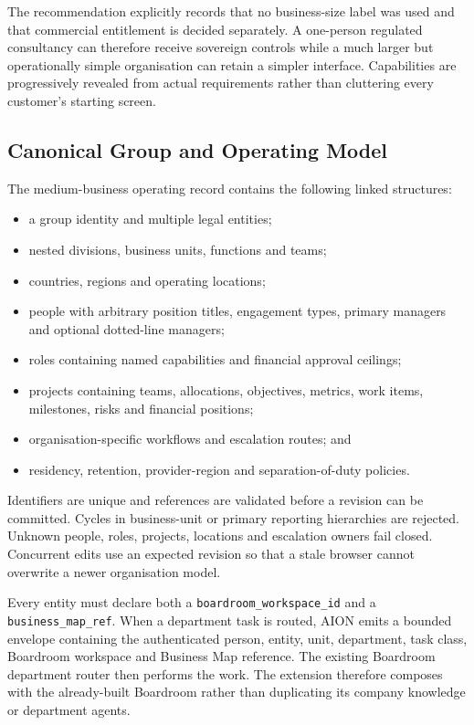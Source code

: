 The recommendation explicitly records that no business-size label was used and that commercial
entitlement is decided separately.  A one-person regulated consultancy can therefore receive
sovereign controls while a much larger but operationally simple organisation can retain a simpler
interface.  Capabilities are progressively revealed from actual requirements rather than cluttering
every customer's starting screen.

\subsection{Canonical Group and Operating Model}

The medium-business operating record contains the following linked structures:

\begin{itemize}
  \item a group identity and multiple legal entities;
  \item nested divisions, business units, functions and teams;
  \item countries, regions and operating locations;
  \item people with arbitrary position titles, engagement types, primary managers and
        optional dotted-line managers;
  \item roles containing named capabilities and financial approval ceilings;
  \item projects containing teams, allocations, objectives, metrics, work items,
        milestones, risks and financial positions;
  \item organisation-specific workflows and escalation routes; and
  \item residency, retention, provider-region and separation-of-duty policies.
\end{itemize}

Identifiers are unique and references are validated before a revision can be committed.
Cycles in business-unit or primary reporting hierarchies are rejected.  Unknown people,
roles, projects, locations and escalation owners fail closed.  Concurrent edits use an
expected revision so that a stale browser cannot overwrite a newer organisation model.

Every entity must declare both a \texttt{boardroom\_workspace\_id} and a
\texttt{business\_map\_ref}.  When a department task is routed, AION emits a bounded
envelope containing the authenticated person, entity, unit, department, task class,
Boardroom workspace and Business Map reference.  The existing Boardroom department router
then performs the work.  The extension therefore composes with the already-built Boardroom
rather than duplicating its company knowledge or department agents.

